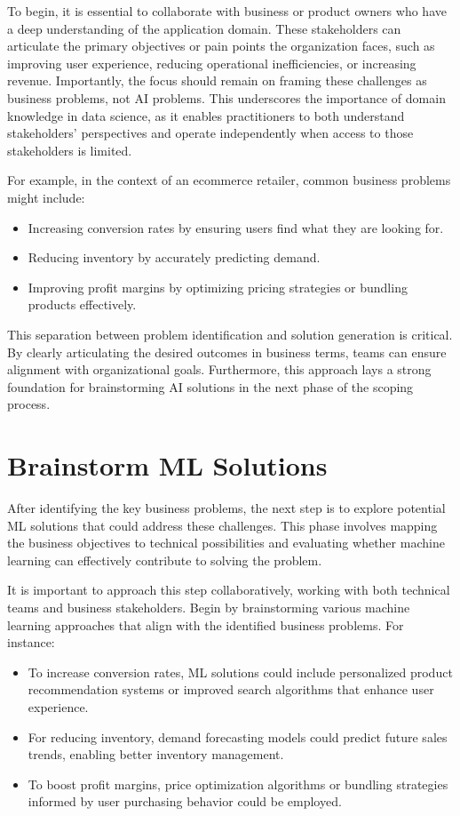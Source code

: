 \documentclass[12pt,openany]{book}
\begin{document}
To begin, it is essential to collaborate with business or product owners who have a deep understanding of the application domain. These stakeholders can articulate the primary objectives or pain points the organization faces, such as improving user experience, reducing operational inefficiencies, or increasing revenue. Importantly, the focus should remain on framing these challenges as business problems, not AI problems. This underscores the importance of domain knowledge in data science, as it enables practitioners to both understand stakeholders' perspectives and operate independently when access to those stakeholders is limited.
\newline

For example, in the context of an ecommerce retailer, common business problems might include:
\begin{itemize}
    \item Increasing conversion rates by ensuring users find what they are looking for.
    \item Reducing inventory by accurately predicting demand.
    \item Improving profit margins by optimizing pricing strategies or bundling products effectively.
\end{itemize}

This separation between problem identification and solution generation is critical. By clearly articulating the desired outcomes in business terms, teams can ensure alignment with organizational goals. Furthermore, this approach lays a strong foundation for brainstorming AI solutions in the next phase of the scoping process.



\section{Brainstorm ML Solutions}

After identifying the key business problems, the next step is to explore potential ML solutions that could address these challenges. This phase involves mapping the business objectives to technical possibilities and evaluating whether machine learning can effectively contribute to solving the problem.
\newline

It is important to approach this step collaboratively, working with both technical teams and business stakeholders. Begin by brainstorming various machine learning approaches that align with the identified business problems. For instance:
\begin{itemize}
    \item To increase conversion rates, ML solutions could include personalized product recommendation systems or improved search algorithms that enhance user experience.
    \item For reducing inventory, demand forecasting models could predict future sales trends, enabling better inventory management.
    \item To boost profit margins, price optimization algorithms or bundling strategies informed by user purchasing behavior could be employed.
\end{itemize}
\end{document}
